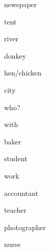 \begin{flashcard}{\LARGE newspaper}
\LARGE {}
\end{flashcard}
\begin{flashcard}{\LARGE tent}
\LARGE {}
\end{flashcard}
\begin{flashcard}{\LARGE river}
\LARGE {}
\end{flashcard}
\begin{flashcard}{\LARGE donkey}
\LARGE {}
\end{flashcard}
\begin{flashcard}{\LARGE hen/chicken}
\LARGE {}
\end{flashcard}
\begin{flashcard}{\LARGE city}
\LARGE {}
\end{flashcard}
\begin{flashcard}{\LARGE who?}
\LARGE {}
\end{flashcard}
\begin{flashcard}{\LARGE with}
\LARGE {}
\end{flashcard}
\begin{flashcard}{\LARGE baker}
\LARGE {}
\end{flashcard}
\begin{flashcard}{\LARGE student}
\LARGE {}
\end{flashcard}
\begin{flashcard}{\LARGE work}
\LARGE {}
\end{flashcard}
\begin{flashcard}{\LARGE accountant}
\LARGE {}
\end{flashcard}
\begin{flashcard}{\LARGE teacher}
\LARGE {}
\end{flashcard}
\begin{flashcard}{\LARGE photographer}
\LARGE {}
\end{flashcard}
\begin{flashcard}{\LARGE nurse}
\LARGE {}
\end{flashcard}
